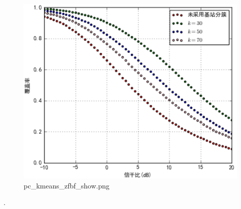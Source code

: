 \documentclass[11pt]{article}
\makeatletter
\def\maxwidth{\ifdim\Gin@nat@width>\linewidth\linewidth
    \else\Gin@nat@width\fi}
\let\Oldincludegraphics\includegraphics
\renewcommand{\includegraphics}[1]{\Oldincludegraphics[width=.8\maxwidth]{#1}}
\makeatother
\begin{document}
\begin{figure}[htbp]
\centering
\includegraphics{pc_kmeans_zfbf_show.png}
\caption{pc\_kmeans\_zfbf\_show.png}
\end{figure}

.


    
    
    
    
\end{document}
